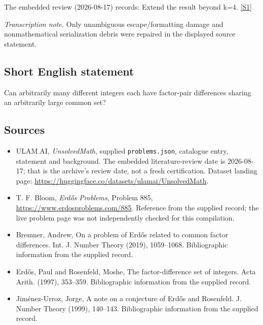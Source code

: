 \documentclass[11pt,a4paper]{article}
\newcommand{\sref}[2]{\hyperlink{source:#1:#2}{[S#2]}}
\begin{document}
The embedded review (2026-08-17) records: Extend the result beyond k=4. \sref{statement}{1}

{\small\emph{Transcription note.} Only unambiguous escape/formatting damage and nonmathematical serialization debris were repaired in the displayed source statement.}

\subsection{Short English statement}

Can arbitrarily many different integers each have factor-pair differences sharing an arbitrarily large common set?

\subsection{Sources}

{\small

\begin{itemize}

\item[\hypertarget{source:statement:1}{S1}] ULAM.AI, \emph{UnsolvedMath}, supplied \texttt{problems.json}, catalogue entry, statement and background. The embedded literature-review date is 2026-08-17; that is the archive’s review date, not a fresh certification. Dataset landing page: \url{https://huggingface.co/datasets/ulamai/UnsolvedMath}.

\item[\hypertarget{source:statement:2}{S2}] T. F. Bloom, \emph{Erdős Problems}, Problem 885, \url{https://www.erdosproblems.com/885}. Reference from the supplied record; the live problem page was not independently checked for this compilation.

\item[\hypertarget{source:statement:3}{S3}] Bremner, Andrew, On a problem of Erd\H{o}s related to common factor differences. Int. J. Number Theory (2019), 1059--1068. Bibliographic information from the supplied record.

\item[\hypertarget{source:statement:4}{S4}] Erd\H{o}s, Paul and Rosenfeld, Moshe, The factor-difference set of integers. Acta Arith. (1997), 353--359. Bibliographic information from the supplied record.

\item[\hypertarget{source:statement:5}{S5}] Jim\'{e}nez-Urroz, Jorge, A note on a conjecture of Erd\H{o}s and {R}osenfeld. J. Number Theory (1999), 140--143. Bibliographic information from the supplied record.

\end{itemize}

}

\label{end:statement}
\end{document}
